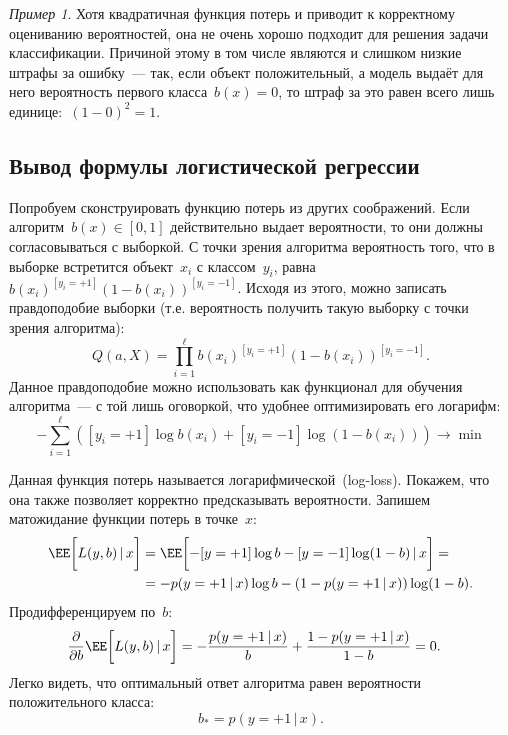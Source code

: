 \documentclass[a4paper, 12pt]{article}
\newcommand{\cond}{\mspace{3mu}{|}\mspace{3mu}}
\theoremstyle{plain} %
\theoremstyle{definition} %
\theoremstyle{remark} %
\newtheorem{example}{Пример}
\begin{document}
\begin{example}
Хотя квадратичная функция потерь и приводит к корректному оцениванию вероятностей,
она не очень хорошо подходит для решения задачи классификации.
Причиной этому в том числе являются и слишком низкие штрафы за ошибку~---
так, если объект положительный, а модель выдаёт для него вероятность первого класса~$b(x) = 0$,
то штраф за это равен всего лишь единице:~$(1 - 0)^2 = 1$.

\subsection{Вывод формулы логистической регрессии}

Попробуем сконструировать функцию потерь из других соображений.
Если алгоритм~$b(x) \in [0, 1]$ действительно выдает вероятности, то
они должны согласовываться с выборкой.
С точки зрения алгоритма вероятность того, что в выборке встретится объект~$x_i$ с классом~$y_i$,
равна~$b(x_i)^{[y_i = +1]} (1 - b(x_i))^{[y_i = -1]}$.
Исходя из этого, можно записать правдоподобие выборки (т.е. вероятность получить такую выборку
с точки зрения алгоритма):
\[
    Q(a, X)
    =
    \prod_{i = 1}^{\ell}
        b(x_i)^{[y_i = +1]} (1 - b(x_i))^{[y_i = -1]}.
\]
Данное правдоподобие можно использовать как функционал для обучения алгоритма~---
с той лишь оговоркой, что удобнее оптимизировать его логарифм:
\[
    -\sum_{i = 1}^{\ell} \left(
        [y_i = +1] \log b(x_i)
        +
        [y_i = -1] \log (1 - b(x_i))
    \right)
    \to
    \min
\]

Данная функция потерь называется логарифмической~(log-loss).
Покажем, что она также позволяет корректно предсказывать вероятности.
Запишем матожидание функции потерь в точке~$x$:
\begin{align*}
    \EE \biggl[
        L(y, b)
        \cond
        x
    \biggr]
    &=
    \EE \biggl[
        -[y = +1] \log b - [y = -1] \log(1 - b)
        \cond
        x
    \biggr]
    =\\
    &=
    -p(y = +1 \cond x) \log b
    -
    (1 - p(y = +1 \cond x)) \log(1 - b).
\end{align*}
Продифференцируем по~$b$:
\begin{align*}
    \frac{\partial}{\partial b}
    \EE \biggl[
        L(y, b)
        \cond
        x
    \biggr]
    &=
    -\frac{p(y = +1 \cond x)}{b} + \frac{1 - p(y = +1 \cond x)}{1 - b}
    =
    0.
\end{align*}
Легко видеть, что оптимальный ответ алгоритма равен вероятности положительного класса:
\[
    b_* = p(y = +1 \cond x).
\]


\end{example}
\end{document}
